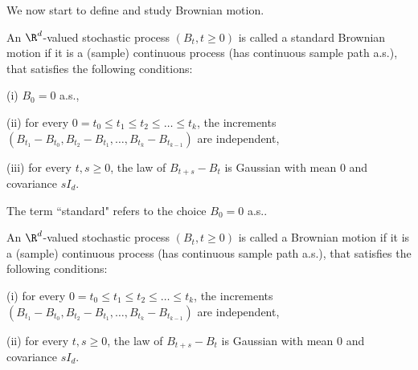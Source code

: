 We now start to define and study Brownian motion.

\begin{definition}\label{def:standard_brownian_motion_d}
An $\R^d$-valued stochastic process $(B_t, t \geq 0)$ is called a standard Brownian motion if it is a (sample) continuous process (has continuous sample path a.s.), that satisfies the following conditions:
\ben
\item [(i)] $B_0 = 0$ a.s.,
\item [(ii)] for every $0 = t_0 \leq t_1 \leq t_2 \leq \dots \leq t_k$, the increments $(B_{t_1} - B_{t_0} ,B_{t_2} - B_{t_1} ,\dots, B_{t_k} - B_{t_{k-1}})$ are independent,
\item [(iii)] for every $t, s \geq 0$, the law of $B_{t+s} - B_t$ is Gaussian with mean 0 and covariance $sI_d$.
\een
\end{definition}

\begin{remark}
The term ``standard" refers to the choice $B_0 = 0$ a.s..%
\end{remark}

\begin{definition}\label{def:brownian_motion_d}
An $\R^d$-valued stochastic process $(B_t, t \geq 0)$ is called a Brownian motion if it is a (sample) continuous process (has continuous sample path a.s.), that satisfies the following conditions:
\ben
\item [(i)] for every $0 = t_0 \leq t_1 \leq t_2 \leq \dots \leq t_k$, the increments $(B_{t_1} - B_{t_0} ,B_{t_2} - B_{t_1} ,\dots, B_{t_k} - B_{t_{k-1}})$ are independent,
\item [(ii)] for every $t, s \geq 0$, the law of $B_{t+s} - B_t$ is Gaussian with mean 0 and covariance $sI_d$.%
\een
\end{definition}


